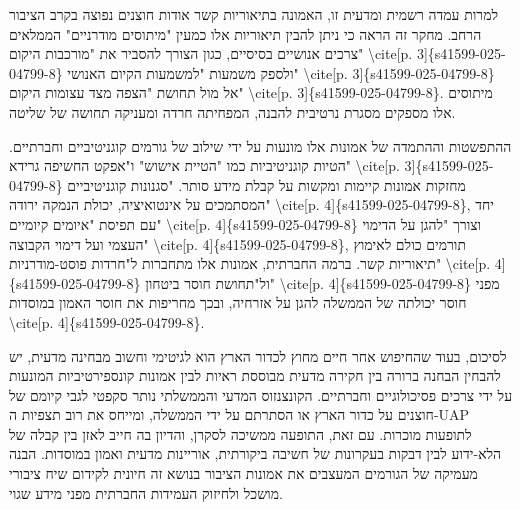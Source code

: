 \documentclass[12pt,a4paper]{article}
\begin{document}
למרות עמדה רשמית ומדעית זו, האמונה בתיאוריות קשר אודות חוצנים נפוצה בקרב הציבור הרחב. מחקר זה הראה כי ניתן להבין תיאוריות אלו כמעין "מיתוסים מודרניים" הממלאים צרכים אנושיים בסיסיים, כגון הצורך להסביר את "מורכבות היקום" \textbackslash{}cite[p. 3]\{s41599-025-04799-8\} ולספק משמעות "למשמעות הקיום האנושי" \textbackslash{}cite[p. 3]\{s41599-025-04799-8\} אל מול תחושת "הצפה מצד עצומות היקום" \textbackslash{}cite[p. 3]\{s41599-025-04799-8\}. מיתוסים אלו מספקים מסגרת נרטיבית להבנה, המפחיתה חרדה ומעניקה תחושה של שליטה.

ההתפשטות וההתמדה של אמונות אלו מונעות על ידי שילוב של גורמים קוגניטיביים וחברתיים. הטיות קוגניטיביות כמו "הטיית אישוש" ו"אפקט החשיפה גרידא" \textbackslash{}cite[p. 3]\{s41599-025-04799-8\} מחזקות אמונות קיימות ומקשות על קבלת מידע סותר. "סגנונות קוגניטיביים המסתמכים על אינטואיציה, יכולת הנמקה ירודה" \textbackslash{}cite[p. 4]\{s41599-025-04799-8\}, יחד עם תפיסת "איומים קיומיים" \textbackslash{}cite[p. 4]\{s41599-025-04799-8\} וצורך "להגן על הדימוי העצמי ועל דימוי הקבוצה" \textbackslash{}cite[p. 4]\{s41599-025-04799-8\}, תורמים כולם לאימוץ תיאוריות קשר. ברמה החברתית, אמונות אלו מתחברות ל"חרדות פוסט-מודרניות" \textbackslash{}cite[p. 4]\{s41599-025-04799-8\} ול"תחושת חוסר ביטחון" \textbackslash{}cite[p. 4]\{s41599-025-04799-8\} מפני חוסר יכולתה של הממשלה להגן על אזרחיה, ובכך מחריפות את חוסר האמון במוסדות \textbackslash{}cite[p. 4]\{s41599-025-04799-8\}.

לסיכום, בעוד שהחיפוש אחר חיים מחוץ לכדור הארץ הוא לגיטימי וחשוב מבחינה מדעית, יש להבחין הבחנה ברורה בין חקירה מדעית מבוססת ראיות לבין אמונות קונספירטיביות המונעות על ידי צרכים פסיכולוגיים וחברתיים. הקונצנזוס המדעי והממשלתי נותר סקפטי לגבי קיומם של חוצנים על כדור הארץ או הסתרתם על ידי הממשלה, ומייחס את רוב תצפיות ה-UAP לתופעות מוכרות. עם זאת, התופעה ממשיכה לסקרן, והדיון בה חייב לאזן בין קבלה של הלא-ידוע לבין דבקות בעקרונות של חשיבה ביקורתית, אוריינות מדעית ואמון במוסדות. הבנה מעמיקה של הגורמים המעצבים את אמונות הציבור בנושא זה חיונית לקידום שיח ציבורי מושכל ולחיזוק העמידות החברתית מפני מידע שגוי.

\printbibliography[title={רשימת מקורות}]
\end{document}
